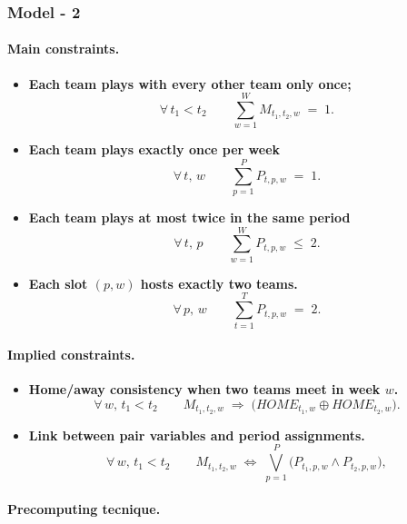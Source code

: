 \subsubsection{Model - 2 }

\paragraph{Main constraints.}

\begin{itemize}
\item[(C1)] \textbf{Each team plays with every other team only once;}
\[
\forall\, t_1<t_2\qquad
\sum_{w=1}^{W} M_{t_1,t_2,w} \;=\; 1.
\]

\item[(C2)] \textbf{Each team plays exactly once per week}
\[
\forall\, t,\,w\qquad
\sum_{p=1}^{P} P_{t,p,w} \;=\; 1.
\]

\item[(C3)] \textbf{Each team plays at most twice in the same period}
\[
\forall\, t,\,p\qquad
\sum_{w=1}^{W} P_{t,p,w} \;\le\; 2.
\]

\item[(C4)] \textbf{Each slot \((p,w)\) hosts exactly two teams.}
\[
\forall\, p,\,w\qquad
\sum_{t=1}^{T} P_{t,p,w} \;=\; 2.
\]
\end{itemize}

\paragraph{Implied constraints.}

\begin{itemize}
\item[(C5)] \textbf{Home/away consistency when two teams meet in week \(w\).}
\[
\forall\, w,\, t_1<t_2\qquad
M_{t_1,t_2,w} \;\Rightarrow\; \big(HOME_{t_1,w} \oplus HOME_{t_2,w}\big).
\]

\item[(C6)] \textbf{Link between pair variables and period assignments.}
\[
\forall\, w,\, t_1<t_2\qquad
M_{t_1,t_2,w} \;\iff\; \bigvee_{p=1}^{P}\big(P_{t_1,p,w}\land P_{t_2,p,w}\big),
\]
\end{itemize}

\paragraph{Precomputing tecnique.}
\label{par:precomputing_sat}

